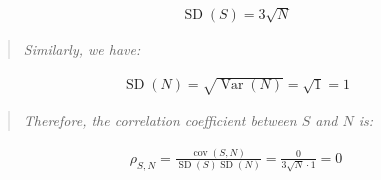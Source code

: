 \documentclass[a4paper]{article}
\begin{document}
\begin{itemize}
        \begin{align*}
            \operatorname{SD}(S) = 3\sqrt{N}
        \end{align*}
        
        \begin{quote}
            \emph{Similarly, we have:}
        \end{quote}
        
        \begin{align*}
            \operatorname{SD}(N) = \sqrt{\operatorname{Var}(N)} = \sqrt{1} = 1
        \end{align*}
        
        \begin{quote}
            \emph{Therefore, the correlation coefficient between $S$ and $N$ is:}
        \end{quote}
        
        \begin{align*}
            \rho_{S,N} = \frac{\operatorname{cov}(S, N)}{\operatorname{SD}(S)\operatorname{SD}(N)} = \frac{0}{3\sqrt{N}\cdot 1} = 0
        \end{align*}
        \end{itemize}
        \vspace*{16\baselineskip}
\end{document}

